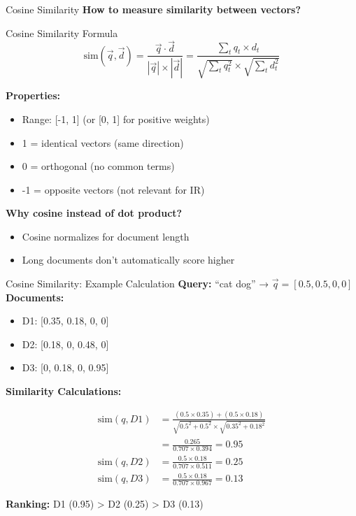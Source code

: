 \documentclass[aspectratio=169]{beamer}
\newif\ifanimated
\newcommand{\cpause}{\ifanimated\pause\fi}
\begin{document}
\begin{frame}[shrink=10]{Cosine Similarity}
\textbf{How to measure similarity between vectors?}

\vspace{1em}

\begin{block}{Cosine Similarity Formula}
$$\text{sim}(\vec{q}, \vec{d}) = \frac{\vec{q} \cdot \vec{d}}{|\vec{q}| \times |\vec{d}|} = \frac{\sum_{t} q_t \times d_t}{\sqrt{\sum_{t} q_t^2} \times \sqrt{\sum_{t} d_t^2}}$$
\end{block}
\cpause
\vspace{1em}

\textbf{Properties:}
\begin{itemize}
    \item Range: [-1, 1] (or [0, 1] for positive weights)
    \item 1 = identical vectors (same direction)
    \item 0 = orthogonal (no common terms)
    \item -1 = opposite vectors (not relevant for IR)
\end{itemize}
\cpause
\vspace{1em}

\textbf{Why cosine instead of dot product?}
\begin{itemize}
    \item Cosine normalizes for document length
    \item Long documents don't automatically score higher
\end{itemize}
\end{frame}

\begin{frame}[shrink=10]{Cosine Similarity: Example Calculation}
\textbf{Query:} ``cat dog'' → $\vec{q} = [0.5, 0.5, 0, 0]$ \\
\textbf{Documents:}
\begin{itemize}
    \item D1: [0.35, 0.18, 0, 0]
    \item D2: [0.18, 0, 0.48, 0]
    \item D3: [0, 0.18, 0, 0.95]
\end{itemize}
\cpause
\vspace{1em}

\textbf{Similarity Calculations:}

\begin{align*}
\text{sim}(q, D1) &= \frac{(0.5 \times 0.35) + (0.5 \times 0.18)}{\sqrt{0.5^2 + 0.5^2} \times \sqrt{0.35^2 + 0.18^2}} \\
&= \frac{0.265}{0.707 \times 0.394} = 0.95 \\
\text{sim}(q, D2) &= \frac{0.5 \times 0.18}{0.707 \times 0.511} = 0.25 \\
\text{sim}(q, D3) &= \frac{0.5 \times 0.18}{0.707 \times 0.967} = 0.13
\end{align*}

\vspace{1em}

\textbf{Ranking:} D1 (0.95)  >  D2 (0.25)  >  D3 (0.13)
\end{frame}
\end{document}
